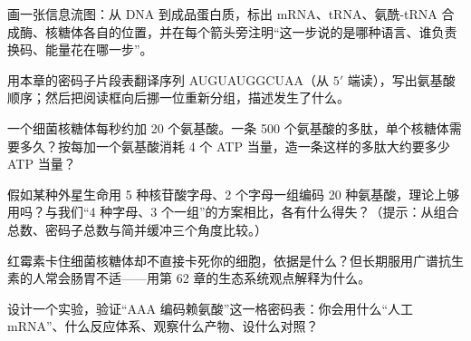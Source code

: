 \begin{sikaoti}
\item 画一张信息流图：从 DNA 到成品蛋白质，标出 mRNA、tRNA、氨酰-tRNA 合成酶、核糖体各自的位置，并在每个箭头旁注明“这一步说的是哪种语言、谁负责换码、能量花在哪一步”。
\item 用本章的密码子片段表翻译序列 AUGUAUGGCUAA（从 $5'$ 端读），写出氨基酸顺序；然后把阅读框向后挪一位重新分组，描述发生了什么。
\item 一个细菌核糖体每秒约加 20 个氨基酸。一条 500 个氨基酸的多肽，单个核糖体需要多久？按每加一个氨基酸消耗 4 个 ATP 当量，造一条这样的多肽大约要多少 ATP 当量？
\item 假如某种外星生命用 5 种核苷酸字母、2 个字母一组编码 20 种氨基酸，理论上够用吗？与我们“4 种字母、3 个一组”的方案相比，各有什么得失？（提示：从组合总数、密码子总数与简并缓冲三个角度比较。）
\item 红霉素卡住细菌核糖体却不直接卡死你的细胞，依据是什么？但长期服用广谱抗生素的人常会肠胃不适——用第 62 章的生态系统观点解释为什么。
\item 设计一个实验，验证“AAA 编码赖氨酸”这一格密码表：你会用什么“人工 mRNA”、什么反应体系、观察什么产物、设什么对照？
\end{sikaoti}
